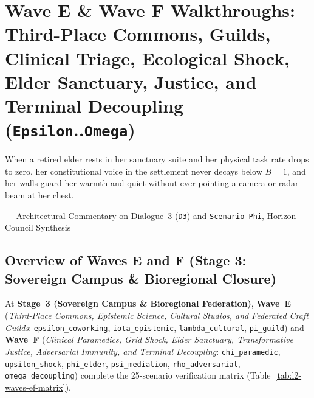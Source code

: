 \chapter{Wave E \& Wave F Walkthroughs: Third-Place Commons, Guilds, Clinical Triage, Ecological Shock, Elder Sanctuary, Justice, and Terminal Decoupling (\texttt{Epsilon}..\texttt{Omega})}
\label{ch:waves-e-and-f-walkthroughs}

\epigraph{When a retired elder rests in her sanctuary suite and her physical task rate drops to zero, her constitutional voice in the settlement never decays below $B = 1$, and her walls guard her warmth and quiet without ever pointing a camera or radar beam at her chest.}{--- Architectural Commentary on Dialogue~3 (\texttt{D3}) and \texttt{Scenario Phi}, Horizon Council Synthesis}

\section{Overview of Waves E and F (Stage 3: Sovereign Campus \& Bioregional Closure)}
\label{sec:l2-waves-ef-overview}

At \textbf{Stage~3 (Sovereign Campus \& Bioregional Federation)}, \textbf{Wave~E} (\textit{Third-Place Commons, Epistemic Science, Cultural Studios, and Federated Craft Guilds}: \texttt{epsilon\_coworking}, \texttt{iota\_epistemic}, \texttt{lambda\_cultural}, \texttt{pi\_guild}) and \textbf{Wave~F} (\textit{Clinical Paramedics, Grid Shock, Elder Sanctuary, Transformative Justice, Adversarial Immunity, and Terminal Decoupling}: \texttt{chi\_paramedic}, \texttt{upsilon\_shock}, \texttt{phi\_elder}, \texttt{psi\_mediation}, \texttt{rho\_adversarial}, \texttt{omega\_decoupling}) complete the 25-scenario verification matrix (Table~\ref{tab:l2-waves-ef-matrix}).

